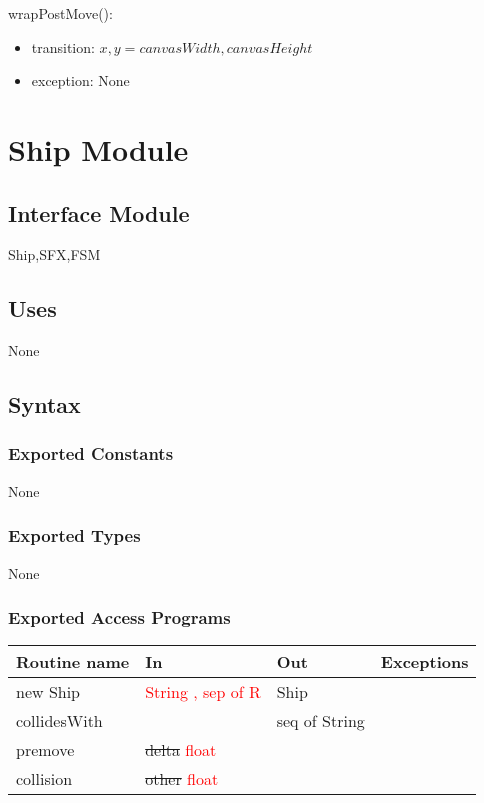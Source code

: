 \documentclass[12pt]{article}
\begin{document}
\noindent wrapPostMove():
\begin{itemize}
\item transition: $x, y = canvasWidth, canvasHeight$
\item exception: None
\end{itemize}

\newpage








\section* {Ship Module}

\subsection*{Interface Module}

Ship,SFX,FSM

\subsection* {Uses}

None

\subsection* {Syntax}

\subsubsection* {Exported Constants}

None

\subsubsection* {Exported Types}

None 

\subsubsection* {Exported Access Programs}

\begin{tabular}{| l | l | l | p{5cm} |}
\hline
\textbf{Routine name} & \textbf{In} & \textbf{Out} & \textbf{Exceptions}\\
\hline
new Ship & \textcolor{red}{String , sep of R} & Ship  & ~\\
\hline
collidesWith & ~ & seq of String & ~\\
\hline
premove & \sout{delta} \textcolor{red}{float} & ~  & ~\\
\hline
collision & \sout{other} \textcolor{red}{float} & ~ & ~ \\
\hline

\end{tabular}
\end{document}
